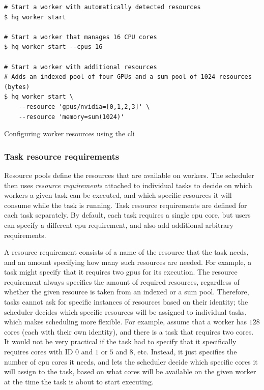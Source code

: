 \begin{listing}[h]
	\begin{verbatim}
# Start a worker with automatically detected resources
$ hq worker start

# Start a worker that manages 16 CPU cores
$ hq worker start --cpus 16

# Start a worker with additional resources
# Adds an indexed pool of four GPUs and a sum pool of 1024 resources (bytes)
$ hq worker start \
	--resource 'gpus/nvidia=[0,1,2,3]' \
	--resource 'memory=sum(1024)'
	\end{verbatim}
	\caption{Configuring worker resources using the \hyperqueue{} \gls{cli}}
	\label{lst:hq-cli-worker-resources}
\end{listing}

\subsubsection*{Task resource requirements}
Resource pools define the resources that are available on workers. The scheduler then uses
\emph{resource requirements} attached to individual tasks to decide on which workers a given task can be
executed, and which specific resources it will consume while the task is running. Task resource
requirements are defined for each task separately. By default, each task requires a single
\gls{cpu} core, but users can specify a different \gls{cpu}
requirement, and also add additional arbitrary requirements.

A resource requirement consists of a name of the resource that the task needs, and an amount
specifying how many such resources are needed. For example, a task might specify that it requires
two \glspl{gpu} for its execution. The resource requirement always specifies the amount
of required resources, regardless of whether the given resource is taken from an indexed or a sum
pool. Therefore, tasks cannot ask for specific instances of resources based on their identity; the
scheduler decides which specific resources will be assigned to individual tasks, which makes
scheduling more flexible. For example, assume that a worker has $128$ cores (each
with their own identity), and there is a task that requires two cores. It would not be very
practical if the task had to specify that it specifically requires cores with ID
$0$ and $1$ or $5$ and
$8$, etc. Instead, it just specifies the number of \gls{cpu} cores
it needs, and lets the scheduler decide which specific cores it will assign to the task, based on
what cores will be available on the given worker at the time the task is about to start executing.


